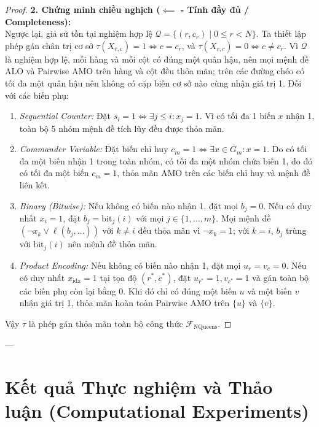 \documentclass[11pt,a4paper]{article}
\begin{document}
\begin{proof}
\noindent\textbf{2. Chứng minh chiều nghịch ($\impliedby$ - Tính đầy đủ / Completeness):}\\
Ngược lại, giả sử tồn tại nghiệm hợp lệ $\mathcal{Q} = \{(r, c_r) \mid 0 \le r < N\}$. Ta thiết lập phép gán chân trị cơ sở $\tau(X_{r,c}) = 1 \iff c = c_r$, và $\tau(X_{r,c}) = 0 \iff c \neq c_r$.
Vì $\mathcal{Q}$ là nghiệm hợp lệ, mỗi hàng và mỗi cột có đúng một quân hậu, nên mọi mệnh đề ALO và Pairwise AMO trên hàng và cột đều thỏa mãn; trên các đường chéo có tối đa một quân hậu nên không có cặp biến cơ sở nào cùng nhận giá trị 1.
Đối với các biến phụ:
\begin{enumerate}
    \item \textit{Sequential Counter:} Đặt $s_i = 1 \iff \exists j \le i: x_j = 1$. Vì có tối đa 1 biến $x$ nhận 1, toàn bộ 5 nhóm mệnh đề tích lũy đều được thỏa mãn.
    \item \textit{Commander Variable:} Đặt biến chỉ huy $c_m = 1 \iff \exists x \in G_m: x = 1$. Do có tối đa một biến nhận 1 trong toàn nhóm, có tối đa một nhóm chứa biến 1, do đó có tối đa một biến $c_m = 1$, thỏa mãn AMO trên các biến chỉ huy và mệnh đề liên kết.
    \item \textit{Binary (Bitwise):} Nếu không có biến nào nhận 1, đặt mọi $b_j = 0$. Nếu có duy nhất $x_i = 1$, đặt $b_j = \text{bit}_j(i)$ với mọi $j \in \{1, \dots, m\}$. Mọi mệnh đề $(\neg x_k \lor \ell(b_j, \dots))$ với $k \neq i$ đều thỏa mãn vì $\neg x_k = 1$; với $k = i$, $b_j$ trùng với $\text{bit}_j(i)$ nên mệnh đề thỏa mãn.
    \item \textit{Product Encoding:} Nếu không có biến nào nhận 1, đặt mọi $u_r = v_c = 0$. Nếu có duy nhất $x_{\text{idx}} = 1$ tại tọa độ $(r^*, c^*)$, đặt $u_{r^*} = 1, v_{c^*} = 1$ và gán toàn bộ các biến phụ còn lại bằng 0. Khi đó chỉ có đúng một biến $u$ và một biến $v$ nhận giá trị 1, thỏa mãn hoàn toàn Pairwise AMO trên $\{u\}$ và $\{v\}$.
\end{enumerate}
Vậy $\tau$ là phép gán thỏa mãn toàn bộ công thức $\mathcal{F}_{\text{NQueens}}$.
\end{proof}

---

\section{Kết quả Thực nghiệm và Thảo luận (Computational Experiments)}
\end{document}
